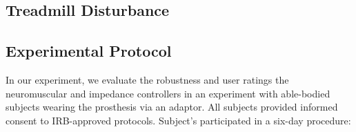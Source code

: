 \subsection{Treadmill Disturbance}\label{sec:treadmill_exp_disturbance}

\subsection{Experimental Protocol}

In our experiment, we evaluate the robustness and user ratings the neuromuscular
and impedance controllers in an experiment with able-bodied subjects wearing the
prosthesis via an adaptor. All subjects provided informed consent to
IRB-approved protocols. Subject's participated in a six-day procedure:


